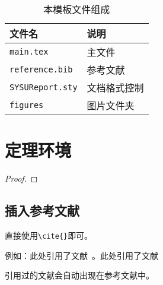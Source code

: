 \documentclass{SYSUReport}
\begin{document}
\begin{table}[!htbp]
    \centering
    \begin{tabular}{l|l}
        \hline
        文件名                  & 说明         \\
        \hline
        \texttt{main.tex}       & 主文件       \\
        \texttt{reference.bib}  & 参考文献     \\
        \texttt{SYSUReport.sty} & 文档格式控制 \\
        \texttt{figures}        & 图片文件夹   \\
        \hline
    \end{tabular}
    \caption{本模板文件组成}
    \label{doc}
\end{table}

\section{定理环境}
\begin{Theorem}
\end{Theorem}

\begin{Lemma}
\end{Lemma}

\begin{Corollary}
\end{Corollary}

\begin{Proposition}
\end{Proposition}

\begin{Definition}
\end{Definition}

\begin{Example}
\end{Example}

\begin{proof}
\end{proof}

\subsection{插入参考文献}

直接使用\verb|\cite{}|即可。

例如：此处引用了文献~\cite{0Isaac}。此处引用了文献~\cite{2016The}

\par 引用过的文献会自动出现在参考文献中。
\end{document}

